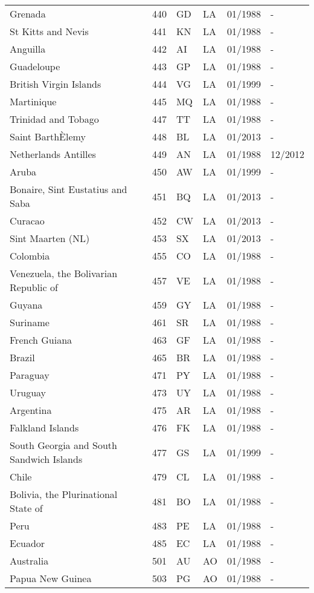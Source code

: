 \begin{small}
\begin{longtable}{p{4.3cm}p{1.5cm}p{1.5cm}p{1cm}p{2cm}p{2cm}}
Grenada	&	440	&	GD	&	LA	&	01/1988	&	-	\\
St Kitts and Nevis	&	441	&	KN	&	LA	&	01/1988	&	-	\\
Anguilla	&	442	&	AI	&	LA	&	01/1988	&	-	\\
Guadeloupe	&	443	&	GP	&	LA	&	01/1988	&	-	\\
British Virgin Islands	&	444	&	VG	&	LA	&	01/1999	&	-	\\
Martinique	&	445	&	MQ	&	LA	&	01/1988	&	-	\\
Trinidad and Tobago	&	447	&	TT	&	LA	&	01/1988	&	-	\\
Saint BarthÈlemy	&	448	&	BL	&	LA	&	01/2013	&	-	\\
Netherlands Antilles	&	449	&	AN	&	LA	&	01/1988	&	12/2012	\\
Aruba	&	450	&	AW	&	LA	&	01/1999	&	-	\\
Bonaire, Sint Eustatius and Saba	&	451	&	BQ	&	LA	&	01/2013	&	-	\\
Curacao	&	452	&	CW	&	LA	&	01/2013	&	-	\\
Sint Maarten (NL)	&	453	&	SX	&	LA	&	01/2013	&	-	\\
Colombia	&	455	&	CO	&	LA	&	01/1988	&	-	\\
Venezuela, the Bolivarian Republic of	&	457	&	VE	&	LA	&	01/1988	&	-	\\
Guyana	&	459	&	GY	&	LA	&	01/1988	&	-	\\
Suriname	&	461	&	SR	&	LA	&	01/1988	&	-	\\
French Guiana	&	463	&	GF	&	LA	&	01/1988	&	-	\\
Brazil	&	465	&	BR	&	LA	&	01/1988	&	-	\\
Paraguay	&	471	&	PY	&	LA	&	01/1988	&	-	\\
Uruguay	&	473	&	UY	&	LA	&	01/1988	&	-	\\
Argentina	&	475	&	AR	&	LA	&	01/1988	&	-	\\
Falkland Islands	&	476	&	FK	&	LA	&	01/1988	&	-	\\
South Georgia and South Sandwich Islands	&	477	&	GS	&	LA	&	01/1999	&	-	\\
Chile	&	479	&	CL	&	LA	&	01/1988	&	-	\\
Bolivia, the Plurinational State of	&	481	&	BO	&	LA	&	01/1988	&	-	\\
Peru	&	483	&	PE	&	LA	&	01/1988	&	-	\\
Ecuador	&	485	&	EC	&	LA	&	01/1988	&	-	\\
Australia	&	501	&	AU	&	AO	&	01/1988	&	-	\\
Papua New Guinea	&	503	&	PG	&	AO	&	01/1988	&	-	\\

\end{longtable}
\end{small}
